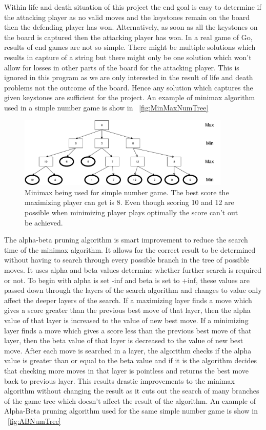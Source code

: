 \documentclass{l4proj}
\begin{document}
Within life and death situation of this project the end goal is easy to determine if the attacking player as no valid moves and the keystones remain on the board then the defending player has won. Alternatively, as soon as all the keystones on the board is captured then the attacking player has won. In a real game of Go, results of end games are not so simple. There might be multiple solutions which results in capture of a string but there might only be one solution which won’t allow for losses in other parts of the board for the attacking player. This is ignored in this program as we are only interested in the result of life and death problems not the outcome of the board. Hence any solution which captures the given keystones are sufficient for the project. An example of minimax algorithm used in a simple number game is show in ~\autoref{fig:MinMaxNumTree}

\begin{figure}[!h]
\centering
\includegraphics[width=0.9\textwidth]{MinMaxNumTree}
\caption{Minimax being used for simple number game. The best score the maximizing player can get is 8. Even though scoring 10 and 12 are possible when minimizing player plays optimally the score can’t out be achieved.}
\label{fig:MinMaxNumTree}
\end{figure}

The alpha-beta pruning algorithm is smart improvement to reduce the search time of the minimax algorithm. It allows for the correct result to be determined without having to search through every possible branch in the tree of possible moves. It uses alpha and beta values determine whether further search is required or not. To begin with alpha is set -inf and beta is set to +inf, these values are passed down through the layers of the search algorithm and changes to value only affect the deeper layers of the search. If a maximizing layer finds a move which gives a score greater than the previous best move of that layer, then the alpha value of that layer is increased to the value of new best move. If a minimizing layer finds a move which gives a score less than the previous best move of that layer, then the beta value of that layer is decreased to the value of new best move.  After each move is searched in a layer, the algorithm checks if the alpha value is greater than or equal to the beta value and if it is the algorithm decides that checking more moves in that layer is pointless and returns the best move back to previous layer. This results drastic improvements to the minimax algorithm without changing the result as it cuts out the search of many branches of the game tree which doesn’t affect the result of the algorithm. An example of Alpha-Beta pruning algorithm used for the same simple number game is show in ~\autoref{fig:ABNumTree}
\end{document}
